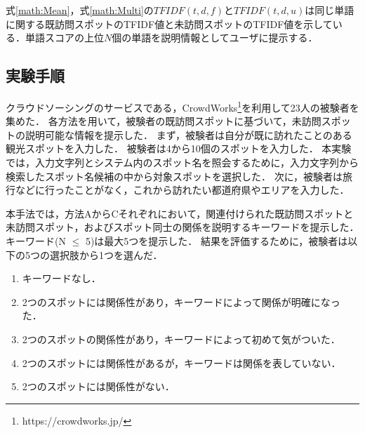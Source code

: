 \documentclass{deimj}
\begin{document}
式\ref{math:Mean}，式\ref{math:Multi}の$TFIDF(t,d,f)$と$TFIDF(t,d,u)$は同じ単語に関する既訪問スポットのTFIDF値と未訪問スポットのTFIDF値を示している．単語スコアの上位$N$個の単語を説明情報としてユーザに提示する．

\subsection{実験手順}
\label{subsec:実験手順}
クラウドソーシングのサービスである，CrowdWorks\footnote{https://crowdworks.jp/}を利用して23人の被験者を集めた．
各方法を用いて，被験者の既訪問スポットに基づいて，未訪問スポットの説明可能な情報を提示した．
まず，被験者は自分が既に訪れたことのある観光スポットを入力した．
被験者は4から10個のスポットを入力した．
本実験では，入力文字列とシステム内のスポット名を照会するために，入力文字列から検索したスポット名候補の中から対象スポットを選択した．
次に，被験者は旅行などに行ったことがなく，これから訪れたい都道府県やエリアを入力した．

本手法では，方法AからCそれぞれにおいて，関連付けられた既訪問スポットと未訪問スポット，およびスポット同士の関係を説明するキーワードを提示した．
キーワード(N $\le$ 5)は最大5つを提示した．
結果を評価するために，被験者は以下の5つの選択肢から1つを選んだ．
\begin{enumerate}
  \item キーワードなし．
  \item 2つのスポットには関係性があり，キーワードによって関係が明確になった．
  \item 2つのスポットの関係性があり，キーワードによって初めて気がついた．
  \item 2つのスポットには関係性があるが，キーワードは関係を表していない．
  \item 2つのスポットには関係性がない．
\end{enumerate}

\end{document}
